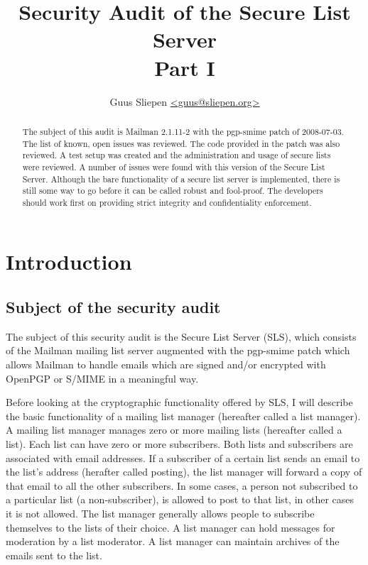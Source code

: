\documentclass[a4]{article}
\title{Security Audit of the Secure List Server\\
Part I}
\author{Guus Sliepen \url{<guus@sliepen.org>}}
\begin{document}
\maketitle

\begin{abstract}
The subject of this audit is 
Mailman 2.1.11-2 with the pgp-smime patch of 2008-07-03.
The list of known, open issues was reviewed.
The code provided in the patch was also reviewed.
A test setup was created and the administration and usage of secure lists were reviewed.
A number of issues were found with this version of the Secure List Server.
Although the bare functionality of a secure list server is implemented,
there is still some way to go before it can be called robust and fool-proof.
The developers should work first on providing strict integrity and confidentiality enforcement.
\end{abstract}

\setlength{\parindent}{0pt}
\setlength{\parskip}{1.5ex}

\section{Introduction}

\subsection{Subject of the security audit}

The subject of this security audit is the Secure List Server (SLS),
which consists of the Mailman mailing list server
augmented with the pgp-smime patch which allows Mailman to handle emails
which are signed and/or encrypted with OpenPGP or S/MIME in a meaningful way.

Before looking at the cryptographic functionality offered by SLS,
I will describe the basic functionality of a mailing list manager (hereafter called a list manager).
A mailing list manager manages zero or more mailing lists (hereafter called a list).
Each list can have zero or more subscribers.
Both lists and subscribers are associated with email addresses.
If a subscriber of a certain list sends an email to the list's address (herafter called posting),
the list manager will forward a copy of that email to all the other subscribers.
In some cases, a person not subscribed to a particular list (a non-subscriber),
is allowed to post to that list, in other cases it is not allowed.
The list manager generally allows people to subscribe themselves to the lists of their choice.
A list manager can hold messages for moderation by a list moderator.
A list manager can maintain archives of the emails sent to the list.
\end{document}

